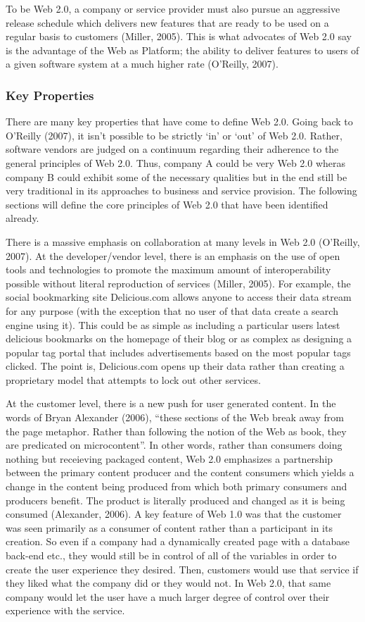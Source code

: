 \documentclass[12pt,oneside,letterpaper]{article}
\begin{document}
To be Web 2.0, a company or service provider must also pursue an aggressive
release schedule which delivers new features that are ready to be used on a
regular basis to customers (Miller, 2005).  This is what advocates of Web 2.0
say is the advantage of the Web as Platform; the ability to deliver features to
users of a given software system at a much higher rate (O'Reilly, 2007).

\subsubsection{Key Properties}

There are many key properties that have come to define Web 2.0.  Going back to
O'Reilly (2007), it isn't possible to be strictly `in' or `out' of Web 2.0.
Rather, software vendors are judged on a continuum regarding their adherence to
the general principles of Web 2.0.  Thus, company A could be very Web 2.0 wheras
company B could exhibit some of the necessary qualities but in the end still be
very traditional in its approaches to business and service provision.  The
following sections will define the core principles of Web 2.0 that have been
identified already.

There is a massive emphasis on collaboration at many levels in Web 2.0
(O'Reilly, 2007).  At the developer/vendor level, there is an emphasis on the
use of open tools and technologies to promote the maximum amount of
interoperability possible without literal reproduction of services (Miller,
2005).  For example, the social bookmarking site Delicious.com allows anyone to
access their data stream for any purpose (with the exception that no user of
that data create a search engine using it).  This could be as simple as
including a particular users latest delicious bookmarks on the homepage of their
blog or as complex as designing a popular tag portal that includes
advertisements based on the most popular tags clicked.  The point is,
Delicious.com opens up their data rather than creating a proprietary model that
attempts to lock out other services.

At the customer level, there is a new push for user generated content.  In the
words of Bryan Alexander (2006), ``these sections of the Web break away from the
page metaphor. Rather than following the notion of the Web as book, they are
predicated on microcontent''.  In other words, rather than consumers doing
nothing but receieving packaged content, Web 2.0 emphasizes a partnership
between the primary content producer and the content consumers which yields a
change in the content being produced from which both primary consumers and
producers benefit.  The product is literally produced and changed as it is being
consumed (Alexander, 2006).  A key feature of Web 1.0 was that the customer was
seen primarily as a consumer of content rather than a participant in its
creation.  So even if a company had a dynamically created page with a database
back-end etc., they would still be in control of all of the variables in order
to create the user experience they desired.  Then, customers would use that
service if they liked what the company did or they would not.  In Web 2.0, that
same company would let the user have a much larger degree of control over their
experience with the service.
\end{document}
